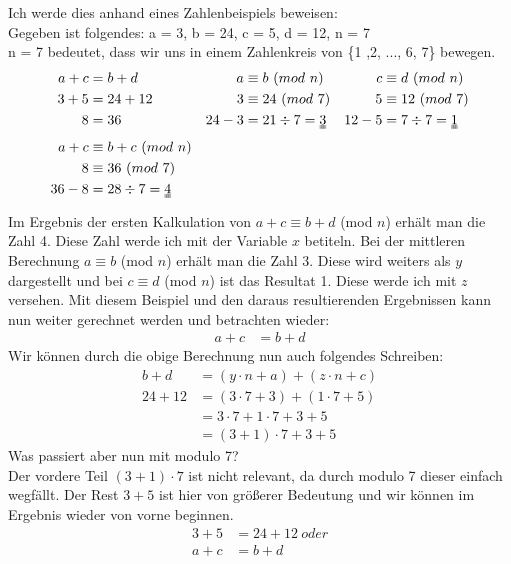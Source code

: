 \documentclass[german,12pt,a4paper]{article}
\begin{document}
Ich werde dies anhand eines Zahlenbeispiels beweisen:\\
Gegeben ist folgendes: a = 3, b = 24, c = 5, d = 12,  n = 7\\
n = 7 bedeutet, dass wir uns in einem Zahlenkreis von \{1 ,2, ..., 6, 7\} bewegen.
\begin{align}\setcounter{equation}{0}
a + c  &= b + d                      & a      &\equiv b\ (mod\ n)          & c      &\equiv d\ (mod\ n)     \\
3 + 5  &= 24 + 12                    & 3      &\equiv 24\ (mod\ 7)         & 5      &\equiv 12\ (mod\ 7)    \\
8      &= 36                         & 24 - 3 &= 21 \div 7 = \uuline{3}    & 12 - 5 &=7 \div 7 = \uuline{1} \\
a + c  &\equiv b + c\ (mod\ n)       &                                     &                                \\ 
8      &\equiv 36\ (mod\ 7)          &                                     &                                \\
36 - 8 &= 28 \div 7 = \uuline{4}     &                                     &
\end{align}
Im Ergebnis der ersten Kalkulation von $a + c \equiv b + d$ (mod $n$) erhält man die Zahl 4.
Diese Zahl werde ich mit der Variable $x$ betiteln.
Bei der mittleren Berechnung $a \equiv b$ (mod $n$) erhält man die Zahl 3.
Diese wird weiters als $y$ dargestellt und bei $c \equiv d$ (mod $n$) ist das Resultat 1.
Diese werde ich mit $z$ versehen.
Mit diesem Beispiel und den daraus resultierenden Ergebnissen kann nun weiter gerechnet werden und betrachten wieder:
\begin{align}
a + c &= b + d
\end{align}
Wir können durch die obige Berechnung nun auch folgendes Schreiben:
\begin{align}
b + d   &= (y \cdot n + a) + (z \cdot n + c) \\
24 + 12 &= (3 \cdot 7 + 3) + (1 \cdot 7 + 5) \\
        &= 3 \cdot 7 + 1 \cdot 7 + 3 + 5     \\
        &= (3 + 1) \cdot 7 + 3 + 5
\end{align}
Was passiert aber nun mit modulo 7?\\
Der vordere Teil $(3 + 1) \cdot 7$ ist nicht relevant, da durch modulo 7 dieser einfach wegfällt.
Der Rest $3 + 5$ ist hier von größerer Bedeutung und wir können im Ergebnis wieder von vorne beginnen.
\begin{align}
3 + 5 &= 24 + 12\ oder \\
a + c &= b + d
\end{align}
\end{document}
